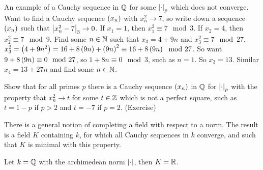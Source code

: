 \begin{example*}
An example of a Cauchy sequence in $ \mathbb{Q} $ for some $ \left\lvert \cdot \right\rvert_p $ which does not converge. Want to find a Cauchy sequence $ \left( x_n \right) $ with $ x_n^2 \to 7 $, so write down a sequence $ \left( x_n \right) $ such that $ \left\lvert x_n^2 - 7 \right\rvert_3 \to 0 $. If $ x_1 = 1 $, then $ x_1^2 \equiv 7 \mod 3 $. If $ x_2 = 4 $, then $ x_2^2 \equiv 7 \mod 9 $. Find some $ n \in \mathbb{N} $ such that $ x_3 = 4 + 9n $ and $ x_3^2 \equiv 7 \mod 27 $. $ x_3^2 = \left( 4 + 9n^2 \right) = 16 + 8\left( 9n \right) + \left( 9n \right)^2 \equiv 16 + 8\left( 9n \right) \mod 27 $. So want $ 9 + 8\left( 9n \right) \equiv 0 \mod 27 $, so $ 1 + 8n \equiv 0 \mod 3 $, such as $ n = 1 $. So $ x_3 = 13 $. Similar $ x_4 = 13 + 27n $ and find some $ n \in \mathbb{N} $.
\end{example*}

\begin{example*}
Show that for all primes $ p $ there is a Cauchy sequence $ \left( x_n \right) $ in $ \mathbb{Q} $ for $ \left\lvert \cdot \right\rvert_p $ with the property that $ x_n^2 \to t $ for some $ t \in \mathbb{Z} $ which is not a perfect square, such as $ t = 1 - p $ if $ p > 2 $ and $ t = -7 $ if $ p = 2 $. (Exercise)
\end{example*}

There is a general notion of completing a field with respect to a norm. The result is a field $ K $ containing $ k $, for which all Cauchy sequences in $ k $ converge, and such that $ K $ is minimal with this property.

\begin{example*}
Let $ k = \mathbb{Q} $ with the archimedean norm $ \left\lvert \cdot \right\rvert $, then $ K = \mathbb{R} $.
\end{example*}


